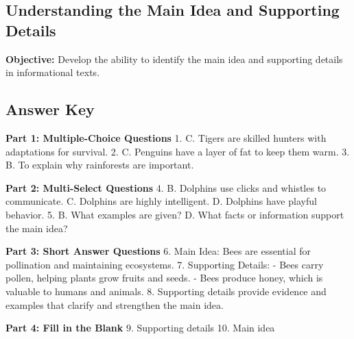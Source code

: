 \documentclass[12pt]{article}
\begin{document}
\subsection*{Understanding the Main Idea and Supporting Details}
\onehalfspacing

\begin{tcolorbox}[colframe=black!40, colback=gray!0, title=Learning Objective]
\textbf{Objective:} Develop the ability to identify the main idea and supporting details in informational texts.
\end{tcolorbox}


\subsection*{Answer Key}

\textbf{Part 1: Multiple-Choice Questions}  
1. C. Tigers are skilled hunters with adaptations for survival.  
2. C. Penguins have a layer of fat to keep them warm.  
3. B. To explain why rainforests are important.  

\textbf{Part 2: Multi-Select Questions}  
4. B. Dolphins use clicks and whistles to communicate.  
   C. Dolphins are highly intelligent.  
   D. Dolphins have playful behavior.  
5. B. What examples are given?  
   D. What facts or information support the main idea?  

\textbf{Part 3: Short Answer Questions}  
6. Main Idea: Bees are essential for pollination and maintaining ecosystems.  
7. Supporting Details:  
   - Bees carry pollen, helping plants grow fruits and seeds.  
   - Bees produce honey, which is valuable to humans and animals.  
8. Supporting details provide evidence and examples that clarify and strengthen the main idea.  

\textbf{Part 4: Fill in the Blank}  
9. Supporting details  
10. Main idea  
\end{document}
